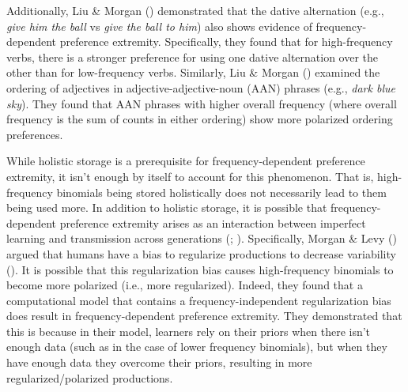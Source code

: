 \documentclass[
  12pt,
]{scrartcl}
\begin{document}
Additionally, Liu \& Morgan
()
demonstrated that the dative alternation (e.g., \emph{give him the ball}
vs \emph{give the ball to him}) also shows evidence of
frequency-dependent preference extremity. Specifically, they found that
for high-frequency verbs, there is a stronger preference for using one
dative alternation over the other than for low-frequency verbs.
Similarly, Liu \& Morgan
()
examined the ordering of adjectives in adjective-adjective-noun (AAN)
phrases (e.g., \emph{dark blue sky}). They found that AAN phrases with
higher overall frequency (where overall frequency is the sum of counts
in either ordering) show more polarized ordering preferences.

While holistic storage is a prerequisite for frequency-dependent
preference extremity, it isn't enough by itself to account for this
phenomenon. That is, high-frequency binomials being stored holistically
does not necessarily lead to them being used more. In addition to
holistic storage, it is possible that frequency-dependent preference
extremity arises as an interaction between imperfect learning and
transmission across generations
(;
). Specifically, Morgan \& Levy
()
argued that humans have a bias to regularize productions to decrease
variability
(). It is possible that this regularization bias
causes high-frequency binomials to become more polarized (i.e., more
regularized). Indeed, they found that a computational model that
contains a frequency-independent regularization bias does result in
frequency-dependent preference extremity. They demonstrated that this is
because in their model, learners rely on their priors when there isn't
enough data (such as in the case of lower frequency binomials), but when
they have enough data they overcome their priors, resulting in more
regularized/polarized productions.
\end{document}
